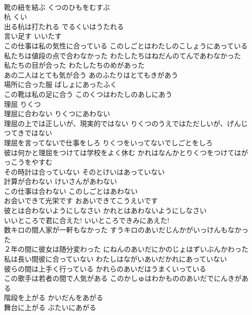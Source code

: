 \documentclass[8pt]{extreport}
\begin{document}
\begin{CJK}{UTF8}{min}
\\	靴の紐を結ぶ	くつのひもをむすぶ	
\\	杭	くい	
\\	出る杭は打たれる	でるくいはうたれる	
\\	言い足す	いいたす	
\\	この仕事は私の気性に合っている	このしごとはわたしのこしょうにあっている	
\\	私たちは値段の点で合わなかった	わたしたちはねだんのてんであわなかった	
\\	私たちの目が合った	わたしたちのめがあった	
\\	あの二人はとても気が合う	あのふたりはとてもきがあう	
\\	場所に合った服	ばしょにあったふく	
\\	この靴は私の足に合う	このくつはわたしのあしにあう	
\\	理屈	りくつ	
\\	理屈に合わない	りくつにあわない	
\\	理屈の上では正しいが、現実的ではない	りくつのうえではただしいが、げんじつてきではない	
\\	理屈を言ってないで仕事をしろ	りくつをいってないでしごとをしろ	
\\	彼は何かと理屈をつけては学校をよく休む	かれはなんかとりくつをつけてはがっこうをやすむ	
\\	その時計は合っていない	そのとけいはあっていない	
\\	計算が合わない	けいさんがあわない	
\\	この仕事は合わない	このしごとはあわない	
\\	お会いできて光栄です	おあいできてこうえいです	
\\	彼とは合わないようにしなさい	かれとはあわないようにしなさい	
\\	いいところで君に合えた!	いいところできみにあえた!	
\\	数キロの間人家が一軒もなかった	すうキロのあいだじんかがいっけんもなかった	
\\	２年の間に彼女は随分変わった	にねんのあいだにかのじょはずいぶんかわった	
\\	私は長い間彼に合っていない	わたしはながいあいだかれにあっていない	
\\	彼らの間は上手く行っている	かれらのあいだはうまくいっている	
\\	この歌手は若者の間で人気がある	このかしゅはわかもののあいだでにんきがある	
\\	階段を上がる	かいだんをあがる	
\\	舞台に上がる	ぶたいにあがる	

\end{CJK}
\end{document}
